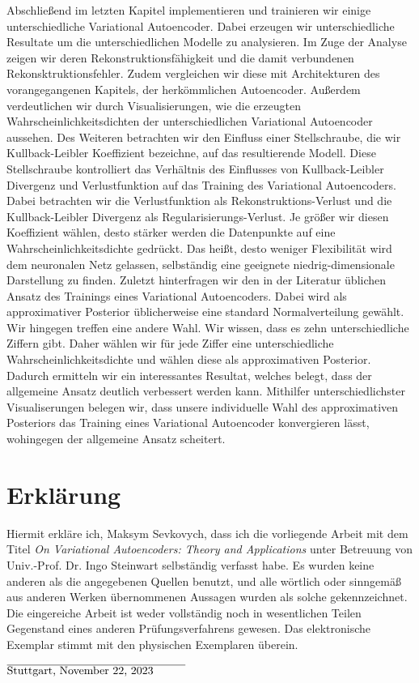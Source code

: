 \documentclass[11pt, twoside, a4paper]{book}
\theoremstyle{plain}
\theoremstyle{definition}
\theoremstyle{plain}
\begin{document}
Abschließend im letzten Kapitel implementieren und trainieren wir einige unterschiedliche Variational Autoencoder. Dabei erzeugen wir unterschiedliche Resultate um die unterschiedlichen Modelle zu analysieren. Im Zuge der Analyse zeigen wir deren Rekonstruktionsfähigkeit und die damit verbundenen Rekonsktruktionsfehler. Zudem vergleichen wir diese mit Architekturen des vorangegangenen Kapitels, der herkömmlichen Autoencoder. Außerdem verdeutlichen wir durch Visualisierungen, wie die erzeugten Wahrscheinlichkeitsdichten der  unterschiedlichen Variational Autoencoder aussehen.
Des Weiteren betrachten wir den Einfluss einer Stellschraube, die wir Kullback-Leibler Koeffizient bezeichne, auf das resultierende Modell. Diese Stellschraube kontrolliert das Verhältnis des Einflusses von Kullback-Leibler Divergenz und Verlustfunktion auf das Training des Variational Autoencoders. Dabei betrachten wir die Verlustfunktion als Rekonstruktions-Verlust und die Kullback-Leibler Divergenz als Regularisierungs-Verlust. Je größer wir diesen Koeffizient wählen, desto stärker werden die Datenpunkte auf eine Wahrscheinlichkeitsdichte \glqq gedrückt\grqq{}. Das heißt, desto weniger Flexibilität wird dem neuronalen Netz gelassen, selbständig eine geeignete niedrig-dimensionale Darstellung zu finden.
Zuletzt hinterfragen wir den in der Literatur üblichen Ansatz des Trainings eines Variational Autoencoders. Dabei wird als approximativer Posterior üblicherweise eine standard Normalverteilung gewählt. Wir hingegen treffen eine andere Wahl. Wir wissen, dass es zehn unterschiedliche Ziffern gibt. Daher wählen wir für jede Ziffer eine unterschiedliche Wahrscheinlichkeitsdichte und wählen diese als approximativen Posterior. Dadurch ermitteln wir ein interessantes Resultat, welches belegt, dass der allgemeine Ansatz deutlich verbessert werden kann. Mithilfer unterschiedlichster Visualiserungen belegen wir, dass unsere individuelle Wahl des approximativen Posteriors das Training eines Variational Autoencoder konvergieren lässt, wohingegen der allgemeine Ansatz scheitert.

\newpage
\section*{Erklärung}

Hiermit erkläre ich, Maksym Sevkovych, dass ich die vorliegende Arbeit mit dem Titel \textit{On Variational Autoencoders: Theory and Applications} unter Betreuung von Univ.-Prof. Dr. Ingo Steinwart selbständig verfasst habe. Es wurden keine anderen als die angegebenen Quellen benutzt, und alle wörtlich oder sinngemäß aus anderen Werken übernommenen Aussagen wurden als solche gekennzeichnet. Die eingereiche Arbeit ist weder vollständig noch in wesentlichen Teilen Gegenstand eines anderen Prüfungsverfahrens gewesen. Das elektronische Exemplar stimmt mit den physischen Exemplaren überein.

\vspace{6 cm}

$\overline{\text{Stuttgart, November 22, 2023} \hspace{1 cm}}$
\end{document}
